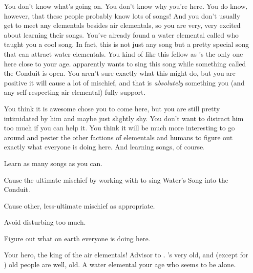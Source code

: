 \documentclass[char]{elementals}
\begin{document}
You don't know what's going on. You don't know why you're here. You do know, however, that these people probably know lots of songs! And you don't usually get to meet any elementals besides air elementals, so you are very, very excited about learning their songs. You've already found a water elemental called \cMiniWater{\intro} who taught you a cool song. In fact, this is not just any song but a pretty special song that can attract water elementals. You kind of like this \cMiniWater{} fellow as \cMiniWater{\they}'s the only one here close to your age. \cMiniWater{\They} apparently wants to sing this song while something called the Conduit is open. You aren't sure exactly what this might do, but you are positive it will cause a lot of mischief, and that is \emph{absolutely} something you (and any self-respecting air elemental) fully support.

You think it is awesome \cKing{} chose you to come here, but you are still pretty intimidated by him and maybe just slightly shy. You don't want to distract him too much if you can help it. You think it will be much more interesting to go around and pester the other factions of elementals and humans to figure out exactly what everyone is doing here. And learning songs, of course.

\begin{itemz}[Goals]
	\item  Learn as many songs as you can.
	\item  Cause the ultimate mischief by working with \cMiniWater{} to sing Water's Song into the Conduit.
	\item  Cause other, less-ultimate mischief as appropriate.
	\item  Avoid disturbing \cKing{} too much.
	\item  Figure out what on earth everyone is doing here.
\end{itemz}

\begin{contacts}
	\contact{\cKing{\intro}} Your hero, the king of the air elementals!
	\contact{\cNaturalist{\intro}} Advisor to \cKing{}. \cNaturalist{\They}'s very old, and (except for \cKing{}) old people are well, old.
	\contact{\cMiniWater{\intro}} A water elemental your age who seems to be alone.
\end{contacts} 
\end{document}
